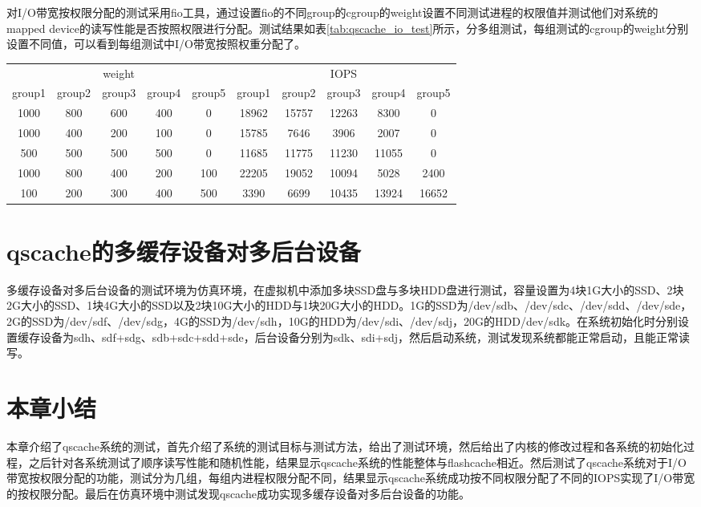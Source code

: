 对I/O带宽按权限分配的测试采用fio工具，通过设置fio的不同group的cgroup的weight设置不同测试进程的权限值并测试他们对系统的mapped device的读写性能是否按照权限进行分配。测试结果如表\ref{tab:qscache_io_test}所示，分多组测试，每组测试的cgroup的weight分别设置不同值，可以看到每组测试中I/O带宽按照权重分配了。

\begin{table}[!hpb]
    \centering
    \begin{tabular}{@{}cccccccccc@{}} 
        \toprule
        \multicolumn{5}{c}{weight} & \multicolumn{5}{c}{IOPS}\\
        group1 & group2 & group3 & group4 & group5 & group1 & group2 & group3 & group4 & group5 \\
        \midrule
        1000 & 800 & 600 & 400 & 0 & 18962 & 15757 & 12263 & 8300 & 0\\
        1000 & 400 & 200 & 100 & 0 & 15785 & 7646 & 3906 & 2007 & 0 \\ 
        500 & 500 & 500 & 500 & 0 & 11685 & 11775 & 11230 & 11055 & 0 \\ 
        1000 & 800 & 400 & 200 & 100 & 22205 & 19052 & 10094 & 5028 & 2400\\ 
        100 & 200 & 300 & 400 & 500 & 3390 & 6699 & 10435 & 13924 & 16652\\
        \bottomrule
    \end{tabular}
\end{table}


\section{qscache的多缓存设备对多后台设备}

多缓存设备对多后台设备的测试环境为仿真环境，在虚拟机中添加多块SSD盘与多块HDD盘进行测试，容量设置为4块1G大小的SSD、2块2G大小的SSD、1块4G大小的SSD以及2块10G大小的HDD与1块20G大小的HDD。1G的SSD为/dev/sdb、/dev/sdc、/dev/sdd、/dev/sde，2G的SSD为/dev/sdf、/dev/sdg，4G的SSD为/dev/sdh，10G的HDD为/dev/sdi、/dev/sdj，20G的HDD/dev/sdk。在系统初始化时分别设置缓存设备为sdh、sdf+sdg、sdb+sdc+sdd+sde，后台设备分别为sdk、sdi+sdj，然后启动系统，测试发现系统都能正常启动，且能正常读写。

\section{本章小结}

本章介绍了qscache系统的测试，首先介绍了系统的测试目标与测试方法，给出了测试环境，然后给出了内核的修改过程和各系统的初始化过程，之后针对各系统测试了顺序读写性能和随机性能，结果显示qscache系统的性能整体与flashcache相近。然后测试了qscache系统对于I/O带宽按权限分配的功能，测试分为几组，每组内进程权限分配不同，结果显示qscache系统成功按不同权限分配了不同的IOPS实现了I/O带宽的按权限分配。最后在仿真环境中测试发现qscache成功实现多缓存设备对多后台设备的功能。
